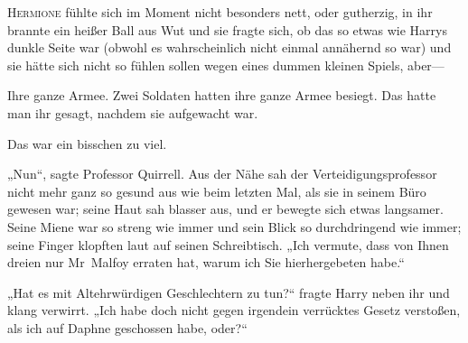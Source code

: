 
\lettrine{H}{ermione} fühlte sich im Moment nicht besonders nett, oder gutherzig, in ihr brannte ein heißer Ball aus Wut und sie fragte sich, ob das so etwas wie Harrys dunkle Seite war (obwohl es wahrscheinlich nicht einmal annähernd so war) und sie hätte sich nicht so fühlen sollen wegen eines dummen kleinen Spiels, aber—

Ihre ganze Armee. Zwei Soldaten hatten ihre ganze Armee besiegt. Das hatte man ihr gesagt, nachdem sie aufgewacht war.

Das war ein bisschen zu viel.

„Nun“, sagte Professor Quirrell. Aus der Nähe sah der Verteidigungsprofessor nicht mehr ganz so gesund aus wie beim letzten Mal, als sie in seinem Büro gewesen war; seine Haut sah blasser aus, und er bewegte sich etwas langsamer. Seine Miene war so streng wie immer und sein Blick so durchdringend wie immer; seine Finger klopften laut auf seinen Schreibtisch. „Ich vermute, dass von Ihnen dreien nur Mr~Malfoy erraten hat, warum ich Sie hierhergebeten habe.“

„Hat es mit Altehrwürdigen Geschlechtern zu tun?“ fragte Harry neben ihr und klang verwirrt. „Ich habe doch nicht gegen irgendein verrücktes Gesetz verstoßen, als ich auf Daphne geschossen habe, oder?“

